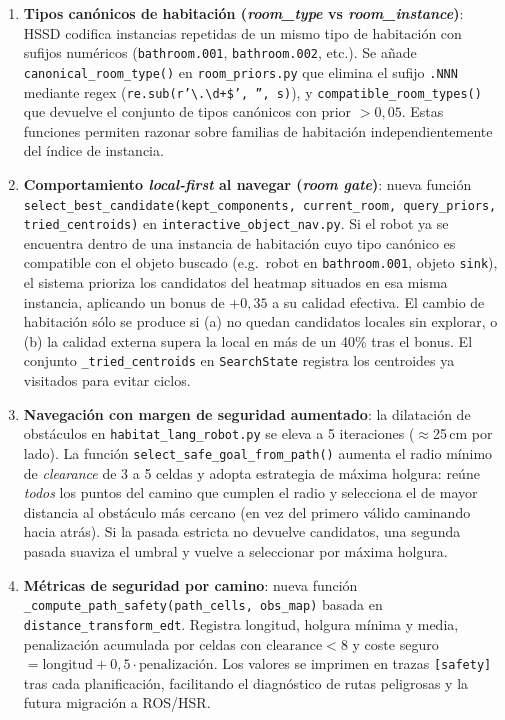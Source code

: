 \documentclass[11pt,a4paper]{article}
\begin{document}
\begin{enumerate}
  \item \textbf{Tipos canónicos de habitación (\textit{room\_type} vs
        \textit{room\_instance})}: HSSD codifica instancias repetidas de un mismo
        tipo de habitación con sufijos numéricos (\texttt{bathroom.001},
        \texttt{bathroom.002}, etc.). Se añade \texttt{canonical\_room\_type()} en
        \texttt{room\_priors.py} que elimina el sufijo \texttt{.NNN} mediante regex
        (\texttt{re.sub(r'\textbackslash.\textbackslash d+\$', '', s)}), y
        \texttt{compatible\_room\_types()} que devuelve el conjunto de tipos
        canónicos con prior $>0{,}05$. Estas funciones permiten razonar sobre
        familias de habitación independientemente del índice de instancia.

  \item \textbf{Comportamiento \textit{local-first} al navegar (\textit{room gate})}:
        nueva función \texttt{select\_best\_candidate(kept\_components, current\_room,
        query\_priors, tried\_centroids)} en \texttt{interactive\_object\_nav.py}. Si
        el robot ya se encuentra dentro de una instancia de habitación cuyo tipo
        canónico es compatible con el objeto buscado (e.g.\ robot en
        \texttt{bathroom.001}, objeto \texttt{sink}), el sistema prioriza los
        candidatos del heatmap situados en esa misma instancia, aplicando un bonus de
        $+0{,}35$ a su calidad efectiva. El cambio de habitación sólo se produce si
        (a) no quedan candidatos locales sin explorar, o (b) la calidad externa supera
        la local en más de un 40\% tras el bonus. El conjunto
        \texttt{\_tried\_centroids} en \texttt{SearchState} registra los centroides ya
        visitados para evitar ciclos.

  \item \textbf{Navegación con margen de seguridad aumentado}: la dilatación de
        obstáculos en \texttt{habitat\_lang\_robot.py} se eleva a 5 iteraciones
        ($\approx$25\,cm por lado). La función
        \texttt{select\_safe\_goal\_from\_path()} aumenta el radio mínimo de
        \textit{clearance} de 3 a 5 celdas y adopta estrategia de máxima holgura:
        reúne \emph{todos} los puntos del camino que cumplen el radio y selecciona el
        de mayor distancia al obstáculo más cercano (en vez del primero válido caminando
        hacia atrás). Si la pasada estricta no devuelve candidatos, una segunda pasada
        suaviza el umbral y vuelve a seleccionar por máxima holgura.

  \item \textbf{Métricas de seguridad por camino}: nueva función
        \texttt{\_compute\_path\_safety(path\_cells, obs\_map)} basada en
        \texttt{distance\_transform\_edt}. Registra longitud, holgura mínima y media,
        penalización acumulada por celdas con $\text{clearance} < 8$ y coste seguro
        $= \text{longitud} + 0{,}5 \cdot \text{penalización}$. Los valores se imprimen
        en trazas \texttt{[safety]} tras cada planificación, facilitando el diagnóstico
        de rutas peligrosas y la futura migración a ROS/HSR.


\end{enumerate}
\end{document}
